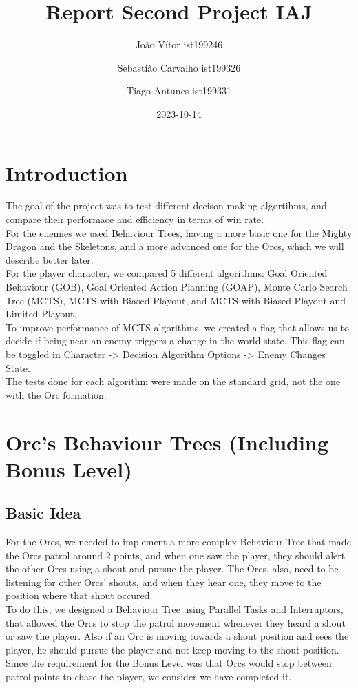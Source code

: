 \documentclass{article}
\title{Report Second Project IAJ}
\author{João Vítor ist199246
  \and Sebastião Carvalho ist199326
  \and Tiago Antunes ist199331}
\date{2023-10-14}
\begin{document}
  \maketitle
  \tableofcontents
  \newpage
  \section{Introduction}
  The goal of the project was to test different decison making algortihms, and compare their performace and efficiency in terms of win rate. \\
  For the enemies we used Behaviour Trees, having a more basic one for the Mighty Dragon and the Skeletons, and a more advanced one for the Orcs, 
  which we will describe better later.\\
  For the player character, we compared 5 different algorithms: Goal Oriented Behaviour (GOB), Goal Oriented Action Planning (GOAP), Monte Carlo Search Tree (MCTS),
  MCTS with Biased Playout, and MCTS with Biased Playout and Limited Playout.\\
  To improve performance of MCTS algorithms, we created a flag that allows us to decide if being near an enemy triggers a change in the world state. 
  This flag can be toggled in Character -> Decision Algorithm Options -> Enemy Changes State. \\
  The tests done for each algorithm were made on the standard grid, not the one with the Orc formation.
  \section{Orc's Behaviour Trees (Including Bonus Level)}
  \subsection{Basic Idea}
  For the Orcs, we needed to implement a more complex Behaviour Tree that made the Orcs patrol around 2 points, and when one saw the player, they should alert the other Orcs
  using a shout and pursue the player. The Orcs, also, need to be listening for other Orcs' shouts, and when they hear one, they move to the position where that shout occured. \\
  To do this, we designed a Behaviour Tree using Parallel Tasks and Interruptors, that allowed the Orcs to stop the patrol movement whenever they heard a shout or 
  saw the player. Also if an Orc is moving towards a shout position and sees the player, he should pursue the player and not keep moving to the shout position.\\
  Since the requirement for the Bonus Level was that Orcs would stop between patrol points to chase the player, we consider we have completed it.
\end{document}
